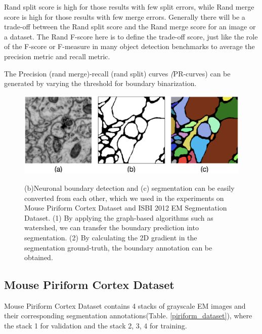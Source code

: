 \documentclass[senior]{IPSstyle}
\begin{document}
Rand split score is high for those results with few split errors, while Rand merge score is high for those results with few merge errors. Generally there will be a trade-off between the Rand split score and the Rand merge score for an image or a dataset. The Rand F-score here is to define the trade-off score, just like the role of the F-score or F-measure in many object detection benchmarks to average the precision metric and recall metric.

The Precision (rand merge)-recall (rand split) curves \emph(PR-curves) can be generated by varying the threshold for boundary binarization\cite{Shen2016CVPR}.

\begin{figure}[t]
  \centering
  \includegraphics[width=15cm]{segmentation_and_boundary.png}\\
  \caption{(b)Neuronal boundary detection and (c) segmentation can be easily converted from each other, which we used in the experiments on Mouse Piriform Cortex Dataset\cite{Lee2015} and ISBI 2012 EM Segmentation Dataset\cite{Ronneberger2015}. (1) By applying the graph-based algorithms such as watershed, we can transfer the boundary prediction into segmentation. (2) By calculating the 2D gradient in the segmentation ground-truth, the boundary annotation can be obtained. }\label{segmentation and boundary}
\end{figure}

\subsection{Mouse Piriform Cortex Dataset}\label{experiment of piriform}

Mouse Piriform Cortex Dataset\cite{Lee2015} contains 4 stacks of grayscale EM images and their corresponding segmentation annotations(Table. \ref{piriform_dataset}), where the stack 1 for validation and the stack 2, 3, 4 for training. 
\end{document}
